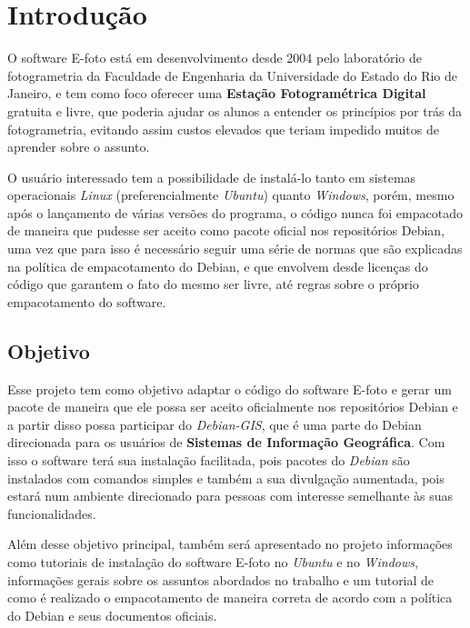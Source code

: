 \chapter*{Introdução}

O software E-foto está em desenvolvimento desde 2004 pelo laboratório de fotogrametria da Faculdade de Engenharia da Universidade do Estado do Rio de Janeiro, e tem como foco oferecer uma \textbf{Estação Fotogramétrica Digital} gratuita e livre, que poderia ajudar os alunos a entender os princípios por trás da fotogrametria, evitando assim custos elevados que teriam impedido muitos de aprender sobre o assunto.

O usuário interessado tem a possibilidade de instalá-lo tanto em sistemas operacionais \textit{Linux} (preferencialmente \textit{Ubuntu}) quanto \textit{Windows}, porém, mesmo após o lançamento de várias versões do programa, o código nunca foi empacotado de maneira que pudesse ser aceito como pacote oficial nos repositórios Debian, uma vez que para isso é necessário seguir uma série de normas que são explicadas na política de empacotamento do Debian, e que envolvem desde licenças do código que garantem o fato do mesmo ser livre, até regras sobre o próprio empacotamento do software.

\section*{Objetivo}

Esse projeto tem como objetivo adaptar o código do software E-foto e gerar um pacote  de maneira que ele possa ser aceito oficialmente nos repositórios Debian e a partir disso possa participar do \textit{Debian-GIS}, que é uma parte do Debian direcionada para os usuários de \textbf{Sistemas de Informação Geográfica}. Com isso o software terá sua instalação facilitada, pois pacotes do \textit{Debian} são instalados com comandos simples e também a sua divulgação aumentada, pois estará num ambiente direcionado para pessoas com interesse semelhante às suas funcionalidades. 

Além desse objetivo principal, também será apresentado no projeto informações como tutoriais de instalação do software E-foto no \textit{Ubuntu} e no \textit{Windows}, informações gerais sobre os assuntos abordados no trabalho e um tutorial de como é realizado o empacotamento de maneira correta de acordo com a política do Debian e seus documentos oficiais.

